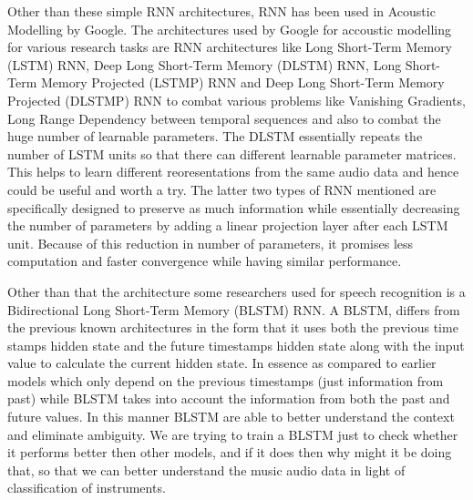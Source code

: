 \documentclass[11pt]{article}
\begin{document}
Other than these simple RNN architectures, RNN has been used in Acoustic Modelling by Google. The architectures used by Google for accoustic modelling \cite{sak2014long} for various research tasks are RNN architectures like Long Short-Term Memory (LSTM) RNN, Deep Long Short-Term Memory (DLSTM) RNN, Long Short-Term Memory Projected (LSTMP) RNN and Deep Long Short-Term Memory Projected (DLSTMP) RNN to combat various problems like Vanishing Gradients, Long Range Dependency between temporal sequences and also to combat the huge number of learnable parameters. The DLSTM essentially repeats the number of LSTM units so that there can different learnable parameter matrices. This helps to learn different reoresentations from the same audio data and hence could be useful and worth a try. The latter two types of RNN mentioned are specifically designed to preserve as much information while essentially decreasing the number of parameters by adding a linear projection layer \cite{sak2014long} after each LSTM unit. Because of this reduction in number of parameters, it promises less computation and faster convergence while having similar performance.

Other than that the architecture some researchers used for speech recognition \cite{graves2014towards} is a Bidirectional Long Short-Term Memory (BLSTM) RNN. A BLSTM, differs from the previous known architectures in the form that it uses both the previous time stamps hidden state and the future timestamps hidden state along with the input value to calculate the current hidden state. In essence as compared to earlier models which only depend on the previous timestamps (just information from past) while BLSTM takes into account the information from both the past and future values. In this manner BLSTM are able to better understand the context and eliminate ambiguity. We are trying to train a BLSTM just to check whether it performs better then other models, and if it does then why might it be doing that, so that we can better understand the music audio data in light of classification of instruments.
\end{document}
